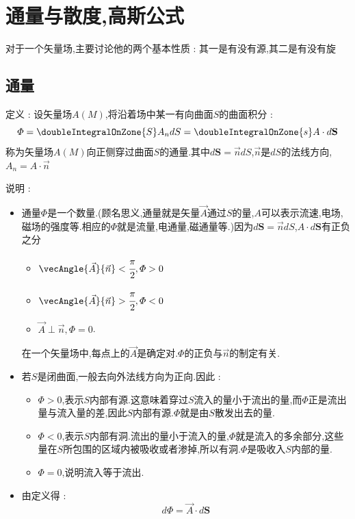{{{   }%

  \section{通量与散度,高斯公式}{
    对于一个矢量场,主要讨论他的两个基本性质 : 其一是有没有源,其二是有没有旋

    \subsection{通量}{
      定义 : 设矢量场$A(M)$,将沿着场中某一有向曲面$S$的曲面积分 :
      $$
        \varPhi = \doubleIntegralOnZone{S} A_n dS = \doubleIntegralOnZone{s} A \cdot d\mathbf{S}
      $$
      称为矢量场$A(M)$向正侧穿过曲面$S$的通量.其中$d\mathbf{S} = \vec{n}dS$,$\vec{n}$是$dS$的法线方向,$A_n = A \cdot \vec{n}$

      说明 :
      \begin{itemize}
        \item {通量$\varPhi$是一个数量.(顾名思义,通量就是矢量$\vec{A}$通过$S$的量,$A$可以表示流速,电场,磁场的强度等.相应的$\varPhi$就是流量,电通量,磁通量等.)因为$d\mathbf{S} = \vec{n}dS$,$A\cdot d\mathbf{S}$有正负之分

              \begin{itemize}
                \item $\vecAngle{\vec{A}}{\vec{n}} < \cfrac{\pi}{2},\varPhi > 0$
                \item $\vecAngle{\vec{A}}{\vec{n}} > \cfrac{\pi}{2},\varPhi < 0$
                \item $\vec{A} \perp \vec{n},\varPhi = 0$.
              \end{itemize}

              在一个矢量场中,每点上的$\vec{A}$是确定对.$\varPhi$的正负与$\vec{n}$的制定有关.
              }
        \item {
              若$S$是闭曲面,一般去向外法线方向为正向.因此 :

              \begin{itemize}
                \item $\varPhi > 0$,表示$S$内部有源.这意味着穿过$S$流入的量小于流出的量,而$\varPhi$正是流出量与流入量的差,因此$S$内部有源.$\varPhi$就是由$S$散发出去的量.
                \item $\varPhi < 0$,表示$S$内部有洞.流出的量小于流入的量,$\varPhi$就是流入的多余部分,这些量在$S$所包围的区域内被吸收或者渗掉,所以有洞.$\varPhi$是吸收入$S$内部的量.
                \item $\varPhi = 0$,说明流入等于流出.
              \end{itemize}
              }
        \item {
              由定义得 :
              $$
                d\varPhi = \vec{A} \cdot d\mathbf{S}
              $$

}
\end{itemize}}}}}
